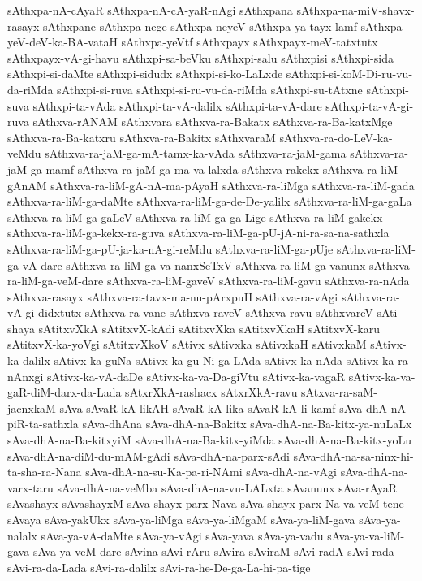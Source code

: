 {sAthxpa-nA-cAyaR
sAthxpa-nA-cA-yaR-nAgi
sAthxpana
sAthxpa-na-miV-shavx-rasayx
sAthxpane
sAthxpa-nege
sAthxpa-neyeV
sAthxpa-ya-tayx-lamf
sAthxpa-yeV-deV-ka-BA-vataH
sAthxpa-yeVtf
sAthxpayx
sAthxpayx-meV-tatxtutx
sAthxpayx-vA-gi-havu
sAthxpi-sa-beVku
sAthxpi-salu
sAthxpisi
sAthxpi-sida
sAthxpi-si-daMte
sAthxpi-sidudx
sAthxpi-si-ko-LaLxde
sAthxpi-si-koM-Di-ru-vu-da-riMda
sAthxpi-si-ruva
sAthxpi-si-ru-vu-da-riMda
sAthxpi-su-tAtxne
sAthxpi-suva
sAthxpi-ta-vAda
sAthxpi-ta-vA-dalilx
sAthxpi-ta-vA-dare
sAthxpi-ta-vA-gi-ruva
sAthxva-rANAM
sAthxvara
sAthxva-ra-Bakatx
sAthxva-ra-Ba-katxMge
sAthxva-ra-Ba-katxru
sAthxva-ra-Bakitx
sAthxvaraM
sAthxva-ra-do-LeV-ka-veMdu
sAthxva-ra-jaM-ga-mA-tamx-ka-vAda
sAthxva-ra-jaM-gama
sAthxva-ra-jaM-ga-mamf
sAthxva-ra-jaM-ga-ma-va-lalxda
sAthxva-rakekx
sAthxva-ra-liM-gAnAM
sAthxva-ra-liM-gA-nA-ma-pAyaH
sAthxva-ra-liMga
sAthxva-ra-liM-gada
sAthxva-ra-liM-ga-daMte
sAthxva-ra-liM-ga-de-De-yalilx
sAthxva-ra-liM-ga-gaLa
sAthxva-ra-liM-ga-gaLeV
sAthxva-ra-liM-ga-ga-Lige
sAthxva-ra-liM-gakekx
sAthxva-ra-liM-ga-kekx-ra-guva
sAthxva-ra-liM-ga-pU-jA-ni-ra-sa-na-sathxla
sAthxva-ra-liM-ga-pU-ja-ka-nA-gi-reMdu
sAthxva-ra-liM-ga-pUje
sAthxva-ra-liM-ga-vA-dare
sAthxva-ra-liM-ga-va-nanxSeTxV
sAthxva-ra-liM-ga-vanunx
sAthxva-ra-liM-ga-veM-dare
sAthxva-ra-liM-gaveV
sAthxva-ra-liM-gavu
sAthxva-ra-nAda
sAthxva-rasayx
sAthxva-ra-tavx-ma-nu-pArxpuH
sAthxva-ra-vAgi
sAthxva-ra-vA-gi-didxtutx
sAthxva-ra-vane
sAthxva-raveV
sAthxva-ravu
sAthxvareV
sAti-shaya
sAtitxvXkA
sAtitxvX-kAdi
sAtitxvXka
sAtitxvXkaH
sAtitxvX-karu
sAtitxvX-ka-yoVgi
sAtitxvXkoV
sAtivx
sAtivxka
sAtivxkaH
sAtivxkaM
sAtivx-ka-dalilx
sAtivx-ka-guNa
sAtivx-ka-gu-Ni-ga-LAda
sAtivx-ka-nAda
sAtivx-ka-ra-nAnxgi
sAtivx-ka-vA-daDe
sAtivx-ka-va-Da-giVtu
sAtivx-ka-vagaR
sAtivx-ka-va-gaR-diM-darx-da-Lada
sAtxrXkA-rashacx
sAtxrXkA-ravu
sAtxva-ra-saM-jacnxkaM
sAva
sAvaR-kA-likAH
sAvaR-kA-lika
sAvaR-kA-li-kamf
sAva-dhA-nA-piR-ta-sathxla
sAva-dhAna
sAva-dhA-na-Bakitx
sAva-dhA-na-Ba-kitx-ya-nuLaLx
sAva-dhA-na-Ba-kitxyiM
sAva-dhA-na-Ba-kitx-yiMda
sAva-dhA-na-Ba-kitx-yoLu
sAva-dhA-na-diM-du-mAM-gAdi
sAva-dhA-na-parx-sAdi
sAva-dhA-na-sa-ninx-hi-ta-sha-ra-Nana
sAva-dhA-na-su-Ka-pa-ri-NAmi
sAva-dhA-na-vAgi
sAva-dhA-na-varx-taru
sAva-dhA-na-veMba
sAva-dhA-na-vu-LALxta
sAvanunx
sAva-rAyaR
sAvashayx
sAvashayxM
sAva-shayx-parx-Nava
sAva-shayx-parx-Na-va-veM-tene
sAvaya
sAva-yakUkx
sAva-ya-liMga
sAva-ya-liMgaM
sAva-ya-liM-gava
sAva-ya-nalalx
sAva-ya-vA-daMte
sAva-ya-vAgi
sAva-yava
sAva-ya-vadu
sAva-ya-va-liM-gava
sAva-ya-veM-dare
sAvina
sAvi-rAru
sAvira
sAviraM
sAvi-radA
sAvi-rada
sAvi-ra-da-Lada
sAvi-ra-dalilx
sAvi-ra-he-De-ga-La-hi-pa-tige
}
